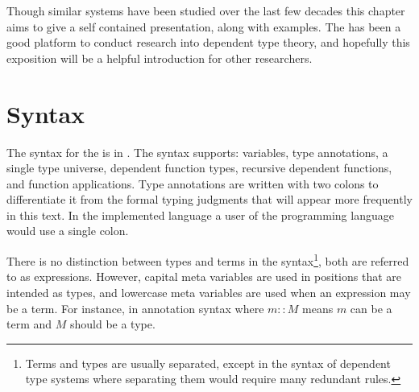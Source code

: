 Though similar systems have been studied over the last few decades this chapter aims to give a self contained presentation, along with examples.
The \slang{} has been a good platform to conduct research into \fullSp{} dependent type theory, and hopefully this exposition will be a helpful introduction for other researchers.
 
\section{\SLang{} Syntax}
 
The syntax for the \slang{} is in .
The syntax supports: variables, type annotations, a single type universe, dependent function types, recursive dependent functions, and function applications.
Type annotations are written with two colons to differentiate it from the formal typing judgments that will appear more frequently in this text.
In the implemented language a user of the programming language would use a single colon.
 
There is no distinction between types and terms in the syntax\footnote{
 Terms and types are usually separated, except in the syntax of \fullSp{} dependent type systems where separating them would require many redundant rules.
}, both are referred to as expressions.
However, capital meta variables are used in positions that are intended as types, and lowercase meta variables are used when an expression may be a term.
For instance, in annotation syntax where $m::M$ means $m$ can be a term and $M$ should be a type.
 
 
